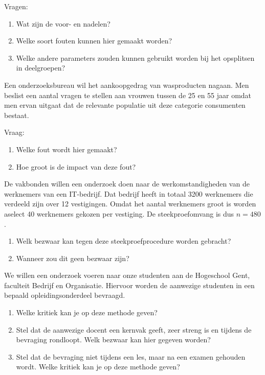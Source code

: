 {\begin{exercise}
  Vragen:
  \begin{enumerate}[label=\alph*.]
    \item Wat zijn de voor- en nadelen?
    \item Welke soort fouten kunnen hier gemaakt worden?
    \item Welke andere parameters zouden kunnen gebruikt worden bij het opsplitsen in deelgroepen?
  \end{enumerate}
\end{exercise}

\begin{exercise}
  Een onderzoeksbureau wil het aankoopgedrag van wasproducten nagaan. Men beslist een aantal vragen te stellen aan vrouwen tussen de 25 en 55 jaar omdat men ervan uitgaat dat de relevante populatie uit deze categorie consumenten bestaat.

  Vraag:

  \begin{enumerate}[label=\alph*.]
    \item Welke fout wordt hier gemaakt?
    \item Hoe groot is de impact van deze fout?
  \end{enumerate}
\end{exercise}

\begin{exercise}
  	De vakbonden willen een onderzoek doen naar de werkomstandigheden van de werknemers van een IT-bedrijf. Dat bedrijf heeft in totaal 3200 werknemers die verdeeld zijn over
  12 vestigingen. Omdat het aantal werknemers groot is worden aselect 40 werknemers gekozen per vestiging. De steekproefomvang is dus $n = 480$.
  \begin{enumerate}[label=\alph*.]
    \item Welk bezwaar kan tegen deze steekproefprocedure worden gebracht?
    \item Wanneer zou dit geen bezwaar zijn?
  \end{enumerate}
\end{exercise}

\begin{exercise}
  We willen een onderzoek voeren naar onze studenten aan de Hogeschool Gent, faculteit Bedrijf en Organisatie. Hiervoor worden de aanwezige studenten in een bepaald opleidingsonderdeel bevraagd.

  \begin{enumerate}[label=\alph*.]
    \item Welke kritiek kan je op deze methode geven?
    \item Stel dat de aanwezige docent een kernvak geeft, zeer streng is en tijdens de bevraging rondloopt. Welk bezwaar kan hier gegeven worden?
    \item Stel dat de bevraging niet tijdens een les, maar na een examen gehouden wordt. Welke kritiek kan je op deze methode geven?
  \end{enumerate}
\end{exercise}

}
